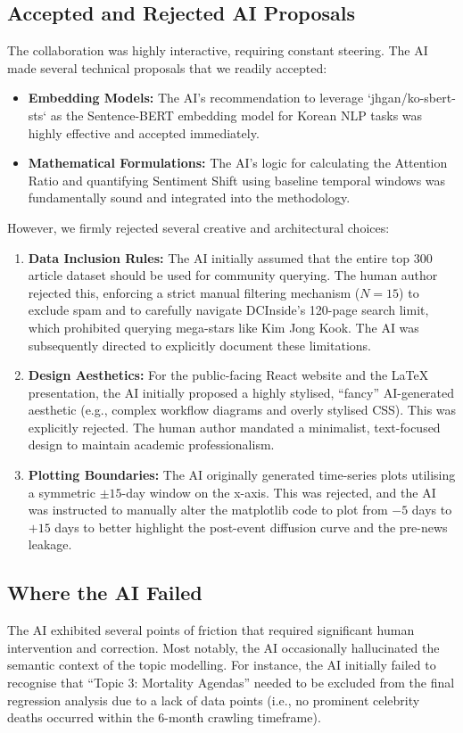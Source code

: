 \documentclass[9pt,twoside,lineno]{pnas-new}
\begin{document}
\begin{article}
\subsection*{Accepted and Rejected AI Proposals}
The collaboration was highly interactive, requiring constant steering. The AI made several technical proposals that we readily accepted:
\begin{itemize}
    \item \textbf{Embedding Models:} The AI's recommendation to leverage `jhgan/ko-sbert-sts` as the Sentence-BERT embedding model for Korean NLP tasks was highly effective and accepted immediately.
    \item \textbf{Mathematical Formulations:} The AI's logic for calculating the Attention Ratio and quantifying Sentiment Shift using baseline temporal windows was fundamentally sound and integrated into the methodology.
\end{itemize}

However, we firmly rejected several creative and architectural choices:
\begin{enumerate}
    \item \textbf{Data Inclusion Rules:} The AI initially assumed that the entire top 300 article dataset should be used for community querying. The human author rejected this, enforcing a strict manual filtering mechanism ($N=15$) to exclude spam and to carefully navigate DCInside's 120-page search limit, which prohibited querying mega-stars like Kim Jong Kook. The AI was subsequently directed to explicitly document these limitations.
    \item \textbf{Design Aesthetics:} For the public-facing React website and the LaTeX presentation, the AI initially proposed a highly stylised, ``fancy'' AI-generated aesthetic (e.g., complex workflow diagrams and overly stylised CSS). This was explicitly rejected. The human author mandated a minimalist, text-focused design to maintain academic professionalism.
    \item \textbf{Plotting Boundaries:} The AI originally generated time-series plots utilising a symmetric $\pm 15$-day window on the x-axis. This was rejected, and the AI was instructed to manually alter the matplotlib code to plot from $-5$ days to $+15$ days to better highlight the post-event diffusion curve and the pre-news leakage.
\end{enumerate}

\subsection*{Where the AI Failed}
The AI exhibited several points of friction that required significant human intervention and correction. Most notably, the AI occasionally hallucinated the semantic context of the topic modelling. For instance, the AI initially failed to recognise that ``Topic 3: Mortality Agendas'' needed to be excluded from the final regression analysis due to a lack of data points (i.e., no prominent celebrity deaths occurred within the 6-month crawling timeframe). 


\end{article}
\end{document}
